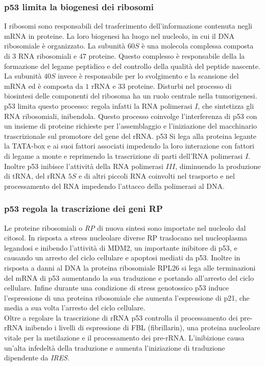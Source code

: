     \subsubsection{p53 limita la biogenesi dei ribosomi}
    I ribosomi sono responsabili del trasferimento dell'informazione contenuta negli mRNA in proteine.
    La loro biogenesi ha luogo nel nucleolo, in cui il DNA ribosomiale \`e organizzato.
    La subunit\`a $60S$ \`e una molecola complessa composta di $3$ RNA ribosomiali e $47$ proteine.
    Questo complesso \`e responsabile della la formazione del legame peptidico e del controllo della qualit\`a del peptide nascente.
    La subunit\`a $40S$ invece \`e responsabile per lo svolgimento e la scansione del mRNA ed \`e composta da $1$ rRNA e $33$ proteine.
    Disturbi nel processo di biosintesi delle componenti del ribosoma ha un ruolo centrale nella tumorigenesi.\\
    p53 limita questo processo: regola infatti la RNA polimerasi $I$, che sintetizza gli RNA ribosomiali, inibendola.
    Questo processo coinvolge l'interferenza di p53 con un insieme di proteine richieste per l'assemblaggio e l'iniziazione del macchinario trascrizionale sul promotore del gene del rRNA.
    p53 Si lega alla proteina legante la TATA-box e ai suoi fattori associati impedendo la loro interazione con fattori di legame a monte e reprimendo la trascrizione di parti dell'RNA polimerasi $I$.\\
    Inoltre p53 inibisce l'attivit\`a della RNA polimerasi $III$, diminuendo la produzione di tRNA, del rRNA $5S$ e di altri piccoli RNA coinvolti nel trasporto e nel processamento del RNA impedendo l'attacco della polimerasi al DNA.

    \subsubsection{p53 regola la trascrizione dei geni RP}
    Le proteine ribosomiali o \emph{RP} di nuova sintesi sono importate nel nucleolo dal citosol.
    In risposta a stress nucleolare diverse RP traslocano nel nucleoplasma legandosi e inibendo l'attivit\`a di MDM2, un importante inibitore di p53, e causando un arresto del ciclo cellulare e apoptosi mediati da p53.
    Inoltre in risposta a danni al DNA la proteina ribosomiale RPL26 si lega alle terminazioni del mRNA di p53 aumentando la sua traduzione e portando all'arresto del ciclo cellulare.
    Infine durante una condizione di stress genotossico p53 induce l'espressione di una proteina ribosomiale che aumenta l'espressione di p21, che media a sua volta l'arresto del ciclo cellulare.\\
    Oltre a regolare la trascrizione di rRNA p53 controlla il processamento dei pre-rRNA inibendo i livelli di espressione di FBL (fibrillarin), una proteina nucleolare vitale per la metilazione e il processamento dei pre-rRNA.
    L'inibizione causa un'alta infedelt\`a della traduzione e aumenta l'iniziazione di traduzione dipendente da \emph{IRES}.


